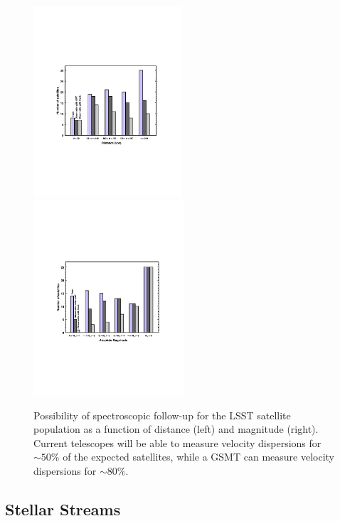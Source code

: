 \begin{figure}
  \centering
  \includegraphics[width=0.49\textwidth]{figures/dwarf_observability_barplot_distance.pdf}
  \includegraphics[width=0.50\textwidth]{figures/dwarf_observability_barplot_luminosity.pdf}
  \caption{Possibility of spectroscopic follow-up for the LSST satellite population as a function of distance (left) and magnitude (right). Current telescopes will be able to measure velocity dispersions for $\sim50\%$ of the expected satellites, while a GSMT can measure velocity dispersions for $\sim80\%$.}
  \label{fig:specfollowup_distance}
\end{figure}

\subsection{Stellar Streams }

